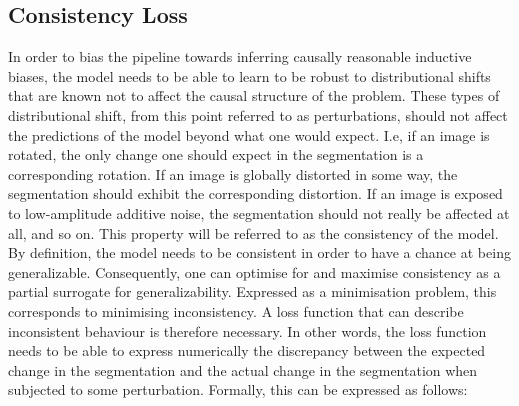 \subsection{Consistency Loss}    
    In order to bias the pipeline towards inferring causally reasonable inductive biases, the model needs to be able to learn to be robust to distributional shifts that are known not to affect the causal structure of the problem. These types of distributional shift, from this point referred to as perturbations, should not affect the predictions of the model beyond what one would expect. I.e, if an image is rotated, the only change one should expect in the segmentation is a corresponding rotation. If an image is globally distorted in some way, the segmentation should exhibit the corresponding distortion. If an image is exposed to low-amplitude additive noise, the segmentation should not really be affected at all, and so on. This property will be referred to as the consistency of the model. By definition, the model needs to be consistent in order to have a chance at being generalizable. Consequently, one can optimise for and maximise consistency as a partial surrogate for generalizability. Expressed as a minimisation problem, this corresponds to minimising inconsistency. A loss function that can describe inconsistent behaviour is therefore necessary. In other words, the loss function needs to be able to express numerically the discrepancy between the expected change in the segmentation and the actual change in the segmentation when subjected to some perturbation. Formally, this can be expressed as follows:

